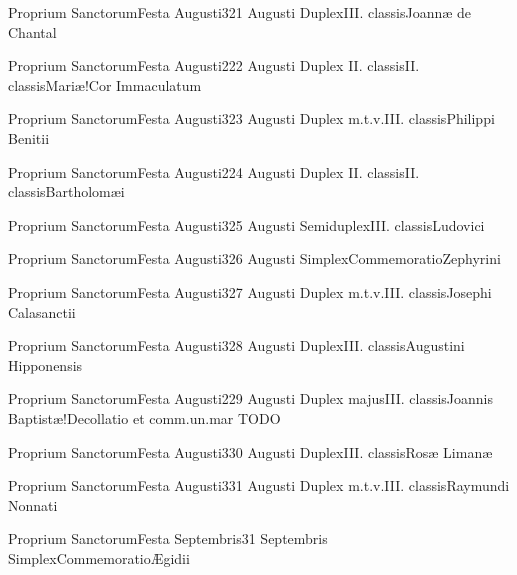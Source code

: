 \documentclass[psalterium-feriale.tex]{subfiles}
\begin{document}
	{Proprium Sanctorum}{Festa Augusti}{3}{21 Augusti}
	{Duplex}{III. classis}{Joannæ de Chantal}
	{}
	{}

	{Proprium Sanctorum}{Festa Augusti}{2}{22 Augusti}
	{Duplex II. classis}{II. classis}{Mariæ!Cor Immaculatum}
	{}
	{}
\psalmodiapropria

	{Proprium Sanctorum}{Festa Augusti}{3}{23 Augusti}
	{Duplex m.t.v.}{III. classis}{Philippi Benitii}
	{}
	{}

	{Proprium Sanctorum}{Festa Augusti}{2}{24 Augusti}
	{Duplex II. classis}{II. classis}{Bartholomæi}
	{}
	{}
\psalmodiapropria

	{Proprium Sanctorum}{Festa Augusti}{3}{25 Augusti}
	{Semiduplex}{III. classis}{Ludovici}
	{}
	{}

	{Proprium Sanctorum}{Festa Augusti}{3}{26 Augusti}
	{Simplex}{Commemoratio}{Zephyrini}
	{}
	{\invitferia}

	{Proprium Sanctorum}{Festa Augusti}{3}{27 Augusti}
	{Duplex m.t.v.}{III. classis}{Josephi Calasanctii}
	{}
	{}

	{Proprium Sanctorum}{Festa Augusti}{3}{28 Augusti}
	{Duplex}{III. classis}{Augustini Hipponensis}
	{}
	{}

	{Proprium Sanctorum}{Festa Augusti}{2}{29 Augusti}
	{Duplex majus}{III. classis}{Joannis Baptistæ!Decollatio}
	{\psalmodiapropria}
	{ et comm.un.mar TODO}

	{Proprium Sanctorum}{Festa Augusti}{3}{30 Augusti}
	{Duplex}{III. classis}{Rosæ Limanæ}
	{}
	{}

	{Proprium Sanctorum}{Festa Augusti}{3}{31 Augusti}
	{Duplex m.t.v.}{III. classis}{Raymundi Nonnati}
	{}
	{}

	{Proprium Sanctorum}{Festa Septembris}{3}{1 Septembris}
	{Simplex}{Commemoratio}{Ægidii}
	{}
	{}
\end{document}
